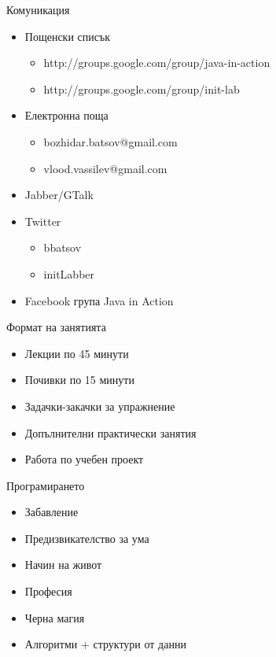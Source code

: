 \documentclass{beamer}
\begin{document}
\begin{frame}{Комуникация}
  \transdissolve
  \begin{itemize}
  \item Пощенски списък 
    \begin{itemize}
    \item http://groups.google.com/group/java-in-action
    \item http://groups.google.com/group/init-lab
    \end{itemize}
    \pause
  \item Електронна поща
    \begin{itemize}
      \item bozhidar.batsov@gmail.com
      \item vlood.vassilev@gmail.com
    \end{itemize}
    \pause
  \item Jabber/GTalk
    \pause
  \item Twitter
    \begin{itemize}
      \item bbatsov
      \item initLabber
    \end{itemize}
    \pause
  \item Facebook група Java in Action
  \end{itemize}
\end{frame}

\begin{frame}{Формат на занятията}
  \transdissolve
  \begin{itemize}
  \item Лекции по 45 минути
  \item Почивки по 15 минути
  \item Задачки-закачки за упражнение
  \item Допълнителни практически занятия
  \item Работа по учебен проект
  \end{itemize}
\end{frame}

\begin{frame}{Програмирането}
  \transdissolve
  \begin{itemize}
  \item Забавление \pause
  \item Предизвикателство за ума \pause
  \item Начин на живот \pause
  \item Професия \pause
  \item Черна магия \pause
  \item Алгоритми + структури от данни \pause
  \end{itemize}
\end{frame}
\end{document}

